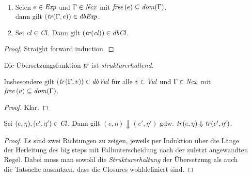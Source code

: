 \documentclass[12pt,fleqn]{article}
\newcommand{\Cl}{\name{Cl}}
\newcommand{\cl}{\name{cl}}
\begin{document}
\begin{lemma} \
  \begin{enumerate}
  \item Seien $e \in {\text{\it Exp\/}}$ und $\Gamma\in{\text{\it Ncx\/}}$ mit ${\text{\it free\/}}\,(e)\subseteq {\text{\it dom\/}}(\Gamma)$, \\
    dann gilt $({\text{\it tr\/}}(\Gamma,e))\in{\text{\it dbExp\/}}$.
  \item Sei $\cl\in\Cl$. Dann gilt $(\tr{\cl})\in\dbCl$.
  \end{enumerate}
\end{lemma}

\begin{proof}
  Straight forward induction.
\end{proof}

\begin{lemma}
  Die \"Ubersetzungsfunktion ${\text{\it tr\/}}$ ist {\em strukturerhaltend}.
\end{lemma}

Insbesondere gilt $({\text{\it tr\/}}(\Gamma,v))\in{\text{\it dbVal\/}}$ f\"ur alle $v\in{\text{\it Val\/}}$ und $\Gamma\in{\text{\it Ncx\/}}$ mit
${\text{\it free\/}}\,(v)\subseteq{\text{\it dom\/}}(\Gamma)$.

\begin{proof}
  Klar.
\end{proof}

\begin{theorem}[\"Aquivalenzsatz]
  Sei $(e,\eta),(e',\eta')\in\Cl$. Dann gilt $(e,\eta) \Downarrow (e',\eta')$ gdw.
  ${\text{\it tr\/}}(e,\eta) \Downarrow {\text{\it tr\/}}(e',\eta')$.
\end{theorem}

\begin{proof}
  Es sind zwei Richtungen zu zeigen, jeweils per Induktion \"uber die L\"ange der Herleitung des big steps mit
  Fallunterscheidung nach der zuletzt angewandten Regel. Dabei muss man sowohl die {\em Strukturerhaltung} der
  \"Ubersetzung als auch die Tatsache ausnutzen, dass die Closures wohldefiniert sind.
\end{proof}
\end{document}
